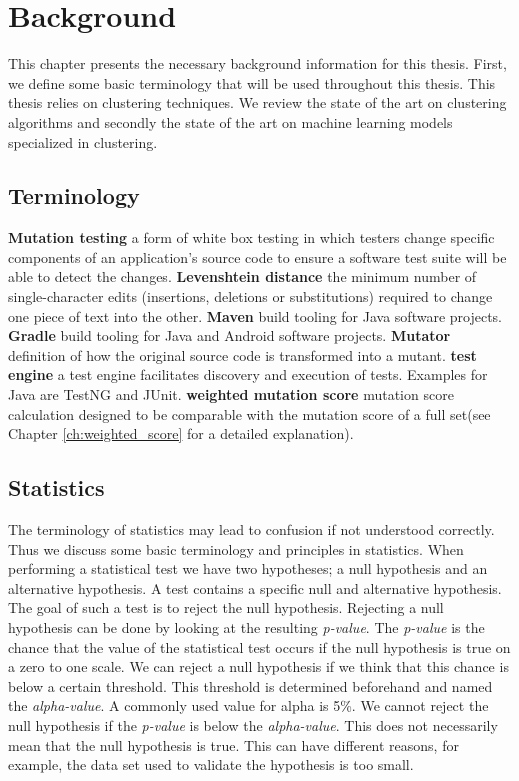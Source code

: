 \documentclass[../main]{subfiles}
\begin{document}
\chapter{Background}
\label{ch:background}
This chapter presents the necessary background information for this thesis. First, we define some basic terminology that will be used throughout this thesis.
This thesis relies on clustering techniques.
We review the state of the art on clustering algorithms and secondly the state of the art on machine learning models specialized in clustering.

\section{Terminology}
\textbf{Mutation testing}
a form of white box testing in which testers change specific components of an application's source code to ensure a software test suite will be able to detect the changes.
\textbf{Levenshtein distance} the minimum number of single-character edits (insertions, deletions or substitutions) required to change one piece of text into the other.
\textbf{Maven} build tooling for Java software projects.
\textbf{Gradle} build tooling for Java and Android software projects.
\textbf{Mutator} definition of how the original source code is transformed into a mutant.
\textbf{test engine} a test engine facilitates discovery and execution of tests. Examples for Java are TestNG and JUnit.
\textbf{weighted mutation score} mutation score calculation designed to be comparable with the mutation score of a full set(see Chapter \ref{ch:weighted_score} for a detailed explanation).

\section{Statistics}
The terminology of statistics may lead to confusion if not understood correctly.
Thus we discuss some basic terminology and principles in statistics.
When performing a statistical test we have two hypotheses; a null hypothesis and an alternative hypothesis.
A test contains a specific null and alternative hypothesis.
The goal of such a test is to reject the null hypothesis.
Rejecting a null hypothesis can be done by looking at the resulting \textit{p-value}.
The \textit{p-value} is the chance that the value of the statistical test occurs if the null hypothesis is true on a
zero to one scale.
We can reject a null hypothesis if we think that this chance is below a certain threshold.
This threshold is determined beforehand and named the \textit{alpha-value}.
A commonly used value for alpha is 5\%.
We cannot reject the null hypothesis if the \textit{p-value} is below the \textit{alpha-value}.
This does not necessarily mean that the null hypothesis is true.
This can have different reasons, for example, the data set used to validate the hypothesis is too small.
\end{document}

